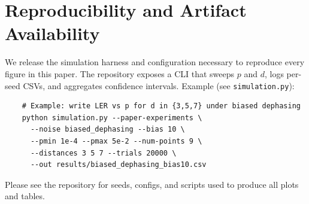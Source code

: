 \documentclass[conference]{IEEEtran}
\begin{document}
    \section{Reproducibility and Artifact Availability}
    \label{sec:repro}
    \noindent We release the simulation harness and configuration necessary to reproduce every figure in this paper. The 
repository exposes a CLI that sweeps $p$ and $d$, logs per-seed CSVs, and aggregates confidence intervals. Example (see 
\texttt{simulation.py}):
    \begin{verbatim}
    # Example: write LER vs p for d in {3,5,7} under biased dephasing
    python simulation.py --paper-experiments \
      --noise biased_dephasing --bias 10 \
      --pmin 1e-4 --pmax 5e-2 --num-points 9 \
      --distances 3 5 7 --trials 20000 \
      --out results/biased_dephasing_bias10.csv
    \end{verbatim}

    Please see the repository for seeds, configs, and scripts used to produce all plots and tables.


    
    

    
\end{document}
